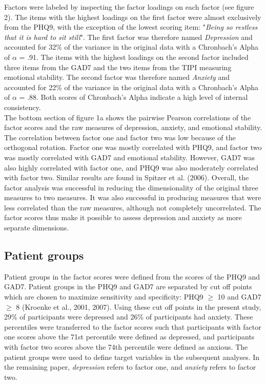 \documentclass[11pt, a4paper]{article}
\begin{document}
Factors were labeled by inspecting the factor loadings on each factor (see figure 2). The items with the highest loadings on the first factor were almost exclusively from the PHQ9, with the exception of the lowest scoring item: "\textit{Being so restless that it is hard to sit still}". The first factor was therefore named \textit{Depression} and accounted for 32\% of the variance in the original data with a Chronbach’s Alpha of $\alpha$ = .91. The items with the highest loadings on the second factor included three items from the GAD7 and the two items from the TIPI measuring emotional stability. The second factor was therefore named \textit{Anxiety} and accounted for 22\% of the variance in the original data with a Chronbach’s Alpha of $\alpha$ = .88. Both scores of Chronbach’s Alpha indicate a high level of internal consistency. \\

The bottom section of figure 1a shows the pairwise Pearson correlations of the factor scores and the raw measures of depression, anxiety, and emotional stability. The correlation between factor one and factor two was low because of the orthogonal rotation. Factor one was mostly correlated with PHQ9, and factor two was mostly correlated with GAD7 and emotional stability. However, GAD7 was also highly correlated with factor one, and PHQ9 was also moderately correlated with factor two. Similar results are found in Spitzer et al. (2006). Overall, the factor analysis was successful in reducing the dimensionality of the original three measures to two measures. It was also successful in producing measures that were less correlated than the raw measures, although not completely uncorrelated. The factor scores thus make it possible to assess depression and anxiety as more separate dimensions.


\subsection{Patient groups}
Patient groups in the factor scores were defined from the scores of the PHQ9 and GAD7. Patient groups in the PHQ9 and GAD7 are separated by cut off points which are chosen to maximize sensitivity and specificity: PHQ9 $\geq$ 10 and GAD7 $\geq$ 8 (Kroenke et al., 2001, 2007). Using these cut off points in the present study, 29\% of participants were depressed and 26\% of participants had anxiety. These percentiles were transferred to the factor scores such that participants with factor one scores above the 71st percentile were defined as depressed, and participants with factor two scores above the 74th percentile were defined as anxious. The patient groups were used to define target variables in the subsequent analyses. In the remaining paper, \textit{depression} refers to factor one, and \textit{anxiety} refers to factor two.
\end{document}
